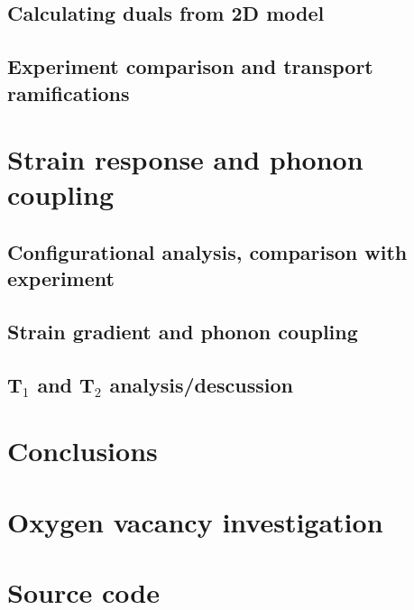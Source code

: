     \section{Calculating duals from 2D model}
    \section{Experiment comparison and transport ramifications}
    \chapter{Strain response and phonon coupling}
    \section{Configurational analysis, comparison with experiment}
    \section{Strain gradient and phonon coupling}
    \section{T$_1$ and T$_2$ analysis/descussion}
    \chapter{Conclusions}

    
    \begin{singlespace} %
    \newcommand{\maybebackrefprint}{ \backrefprint}
    \renewcommand*{\bibpreamble}{\thumb{Bibliography}}%
    
    \end{singlespace}

  
    \chapter{Oxygen vacancy investigation}
    \chapter{Source code}

  \backmatter
   



